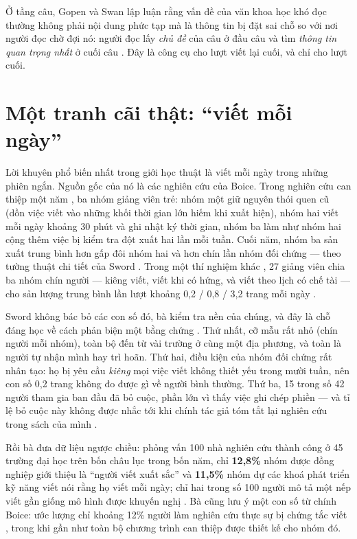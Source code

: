 \documentclass[../hieu-suat.tex]{subfiles}
\begin{document}
Ở tầng câu, Gopen và Swan \cite{gopen1990} lập luận rằng vấn đề của văn khoa học khó đọc thường không phải nội dung phức tạp mà là thông tin bị đặt sai chỗ so với nơi người đọc chờ đợi nó: người đọc lấy \emph{chủ đề} của câu ở đầu câu và tìm \emph{thông tin quan trọng nhất} ở cuối câu \nT{}. Đây là công cụ cho lượt viết lại cuối, và chỉ cho lượt cuối.

\section{Một tranh cãi thật: ``viết mỗi ngày''}

Lời khuyên phổ biến nhất trong giới học thuật là viết mỗi ngày trong những phiên ngắn. Nguồn gốc của nó là các nghiên cứu của Boice. Trong nghiên cứu can thiệp một năm \cite{boice1989}, ba nhóm giảng viên trẻ: nhóm một giữ nguyên thói quen cũ (dồn việc viết vào những khối thời gian lớn hiếm khi xuất hiện), nhóm hai viết mỗi ngày khoảng 30 phút và ghi nhật ký thời gian, nhóm ba làm như nhóm hai cộng thêm việc bị kiểm tra đột xuất hai lần mỗi tuần. Cuối năm, nhóm ba sản xuất trung bình hơn gấp đôi nhóm hai và hơn chín lần nhóm đối chứng \nD{} --- theo tường thuật chi tiết của Sword \cite[tr.~315]{sword2016}. Trong một thí nghiệm khác \cite{boice1983}, 27 giảng viên chia ba nhóm chín người --- kiêng viết, viết khi có hứng, và viết theo lịch có chế tài --- cho sản lượng trung bình lần lượt khoảng 0,2 / 0,8 / 3,2 trang mỗi ngày \nD{}.

Sword \cite{sword2016} không bác bỏ các con số đó, bà kiểm tra nền của chúng, và đây là chỗ đáng học về cách phản biện một bằng chứng \nM{}. Thứ nhất, cỡ mẫu rất nhỏ (chín người mỗi nhóm), toàn bộ đến từ vài trường ở cùng một địa phương, và toàn là người tự nhận mình hay trì hoãn. Thứ hai, điều kiện của nhóm đối chứng rất nhân tạo: họ bị yêu cầu \emph{kiêng} mọi việc viết không thiết yếu trong mười tuần, nên con số 0,2 trang không đo được gì về người bình thường. Thứ ba, 15 trong số 42 người tham gia ban đầu đã bỏ cuộc, phần lớn vì thấy việc ghi chép phiền --- và tỉ lệ bỏ cuộc này không được nhắc tới khi chính tác giả tóm tắt lại nghiên cứu trong sách của mình \nD{}.

Rồi bà đưa dữ liệu ngược chiều: phỏng vấn 100 nhà nghiên cứu thành công ở 45 trường đại học trên bốn châu lục trong bốn năm, chỉ \textbf{12,8\%} nhóm được đồng nghiệp giới thiệu là ``người viết xuất sắc'' và \textbf{11,5\%} nhóm dự các khoá phát triển kỹ năng viết nói rằng họ viết mỗi ngày; chỉ hai trong số 100 người mô tả một nếp viết gần giống mô hình được khuyến nghị \nD{}. Bà cũng lưu ý một con số từ chính Boice: ước lượng chỉ khoảng 12\% người làm nghiên cứu thực sự bị chứng tắc viết \nD{}, trong khi gần như toàn bộ chương trình can thiệp được thiết kế cho nhóm đó.
\end{document}

